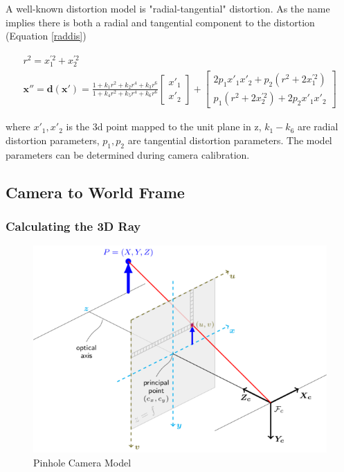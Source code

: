\documentclass[11pt,twoside]{report}
\begin{document}
A well-known distortion model is "radial-tangential" distortion. As the name implies there is both a radial and tangential component to the distortion (Equation \ref{raddis}) 

\begin{equation}
\begin{aligned}
r^{2} = x_{1}^{'2} + x_{2}^{'2} \\
\mathbf{x''} = \mathbf{d(x')} = \frac{1 + k_{1}r^{2} + k_{2}r^{4}+k_{3}r^{6}}{1+ k_{4}r^{2} + k_{5}r^{4}+k_{6}r^{6}}
\begin{bmatrix}
x'_{1} \\[0.3em]
x'_{2}
\end{bmatrix}
+ 
\begin{bmatrix}
2p_{1}x'_{1}x'_{2} + p_{2}(r^{2} + 2x_{1}^{'2}) \\[0.3em]
p_{1}(r^{2} + 2x_{2}^{'2}) + 2p_{2}x'_{1}x'_{2}
\end{bmatrix}
\end{aligned}
\label{raddis}
\end{equation}

where $x'_{1},x'_{2}$ is the 3d point mapped to the unit plane in z, $k_{1}-k_{6}$ are radial distortion parameters, $p_{1},p_{2}$ are tangential distortion parameters. The model parameters can be determined during camera calibration.


\subsection{Camera to World Frame} \label{cam2world}

\subsubsection{Calculating the 3D Ray}

\noindent \begin{figure}[h!]
	\includegraphics[width = 1.0\hsize]{figures/pinhole_camera_model.png}
	\caption{Pinhole Camera Model}
	\label{pinhole_model}
\end{figure}
\end{document}
